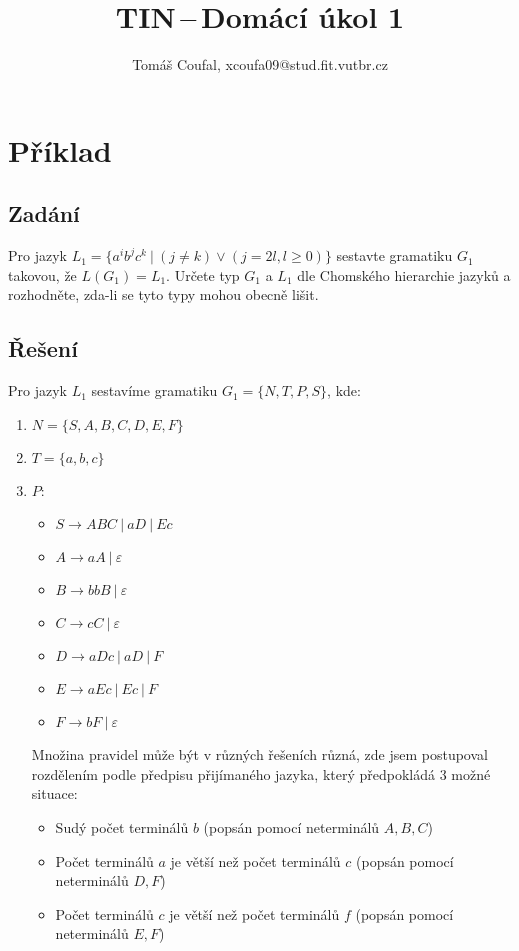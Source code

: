 \documentclass[11pt, a4paper]{article}
\title{TIN\,--\,Domácí úkol 1}
\author{Tomáš Coufal, xcoufa09@stud.fit.vutbr.cz}
\begin{document}
\maketitle
\section{Příklad}
\subsection*{Zadání}
Pro jazyk $L_1 = \{a^ib^jc^k\ |\ (j \ne k) \vee (j = 2l, l \geq 0)\}$ sestavte gramatiku $G_1$ takovou, že $L(G_1) = L_1$.
Určete typ $G_1$ a $L_1$ dle Chomského hierarchie jazyků a rozhodněte, zda-li se tyto typy mohou obecně lišit.
\subsection*{Řešení}
Pro jazyk $L_1$ sestavíme gramatiku $ G_1 = \{N, T, P, S\} $, kde:
\begin{enumerate}
	\item $ N = \{S, A, B, C, D, E, F\} $
	\item $ T = \{a, b, c\} $
	\item $ P $:
	      \begin{itemize}[label={},noitemsep]
	      	\item $ S \rightarrow ABC\ |\ aD\ |\ Ec $
	      	\item $ A \rightarrow aA\ |\ \varepsilon $
	      	\item $ B \rightarrow bbB\ |\ \varepsilon $
	      	\item $ C \rightarrow cC\ |\ \varepsilon$
	      	\item $ D \rightarrow aDc\ |\ aD\ |\ F$
	      	\item $ E \rightarrow aEc\ |\ Ec\ |\ F$
	      	\item $ F \rightarrow bF\ |\ \varepsilon$
	      \end{itemize}
	      Množina pravidel může být v různých řešeních různá, zde jsem postupoval rozdělením podle předpisu přijímaného
	      jazyka, který předpokládá 3 možné situace:
	      \begin{itemize}[label={-},noitemsep]
	      	\item Sudý počet terminálů $b$ (popsán pomocí neterminálů $A, B, C$)
	      	\item Počet terminálů $a$ je větší než počet terminálů $c$ (popsán pomocí neterminálů $D, F$)
	      	\item Počet terminálů $c$ je větší než počet terminálů $f$ (popsán pomocí neterminálů $E, F$)
	      \end{itemize}
\end{enumerate}
\end{document}
